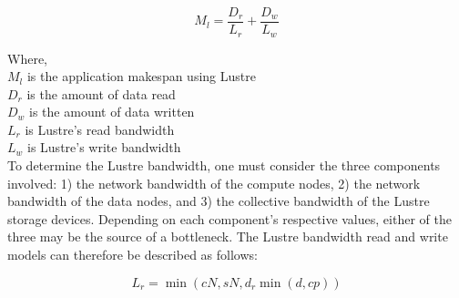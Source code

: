\documentclass[10pt,journal,compsoc]{IEEEtran}
\begin{document}
      \begin{equation}\label{eq:sea-comp:lustrenpc}
          M_{l} =  \frac{D_{r}}{L_{r}} + \frac{D_{w}}{L_{w}}
      \end{equation}

      {\noindent} Where, \\
      $M_{l}$ is the application makespan using Lustre \\
      $D_{r}$ is the amount of data read \\
      $D_{w}$ is the amount of data written \\
      $L_{r}$ is Lustre's read bandwidth \\
      $L_{w}$ is Lustre's write bandwidth \\



      To determine the Lustre bandwidth, one must consider the three components
  involved: 1) the network bandwidth of the compute nodes, 2) the network
  bandwidth of the data nodes, and 3) the collective bandwidth of the Lustre
  storage devices. Depending on each component's respective values, either of
  the three may be the source of a bottleneck. The Lustre bandwidth read and
  write models can therefore be described as follows:

    \begin{equation} %
        L_{r} = \min{(cN, sN, d_{r}\min{(d, cp)})}
    \end{equation}
\end{document}
